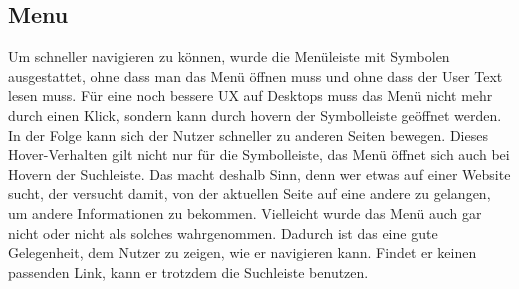 \subsection{Menu}
Um schneller navigieren zu können, wurde die Menüleiste mit Symbolen ausgestattet, ohne dass man das Menü öffnen muss und ohne dass der User Text lesen muss. Für eine noch bessere UX auf Desktops muss das Menü nicht mehr durch einen Klick, sondern kann durch hovern der Symbolleiste geöffnet werden. In der Folge kann sich der Nutzer schneller zu anderen Seiten bewegen. Dieses Hover-Verhalten gilt nicht nur für die Symbolleiste, das Menü öffnet sich auch bei Hovern der Suchleiste. Das macht deshalb Sinn, denn wer etwas auf einer Website sucht, der versucht damit, von der aktuellen Seite auf eine andere zu gelangen, um andere Informationen zu bekommen. Vielleicht wurde das Menü auch gar nicht oder nicht als solches wahrgenommen. Dadurch ist das eine gute Gelegenheit, dem Nutzer zu zeigen, wie er navigieren kann. Findet er keinen passenden Link, kann er trotzdem die Suchleiste benutzen.
